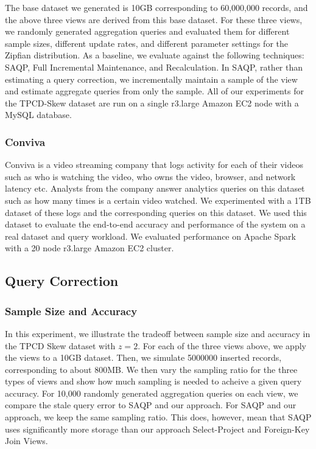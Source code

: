 \vspace{1em}

The base dataset we generated is 10GB corresponding to 60,000,000 records, and the above three views are derived from this base dataset.
For these three views, we randomly generated aggregation queries and evaluated them for different sample sizes, different update rates, and different parameter settings for the Zipfian distribution.
As a baseline, we evaluate against the following techniques: SAQP, Full Incremental Maintenance, and Recalculation.
In SAQP, rather than estimating a query correction, we incrementally maintain a sample of the view and estimate aggregate queries from only the sample.
All of our experiments for the TPCD-Skew dataset are run on a single r3.large Amazon EC2 node with a MySQL database.

\subsubsection{Conviva}
Conviva is a video streaming company that logs activity for each of their videos such as who is watching the video, who owns the video, browser, and network latency etc. 
Analysts from the company answer analytics queries on this dataset such as how many times is a certain video watched.
We experimented with a 1TB dataset of these logs and the corresponding queries on this dataset.
We used this dataset to evaluate the end-to-end accuracy and performance of the system on a real dataset and query workload.
We evaluated performance on Apache Spark with a 20 node r3.large Amazon EC2 cluster. 

\subsection{Query Correction}

\subsubsection{Sample Size and Accuracy}
In this experiment, we illustrate the tradeoff between sample size and accuracy in the TPCD Skew dataset with $z = 2$.
For each of the three views above, we apply the views to a 10GB dataset.
Then, we simulate 5000000 inserted records, corresponding to about 800MB.
We then vary the sampling ratio for the three types of views and show how much sampling is needed to acheive a given query accuracy.
For 10,000 randomly generated aggregation queries on each view, we compare the stale query error to SAQP and our approach.
For SAQP and our approach, we keep the same sampling ratio.
This does, however, mean that SAQP uses significantly more storage than our approach Select-Project and Foreign-Key Join Views.

